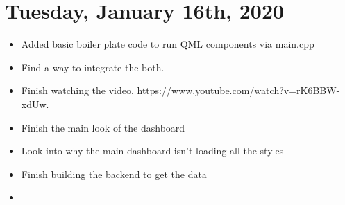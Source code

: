 \documentclass{article}
\begin{document}
    \section{Tuesday, January 16th, 2020}

        \begin{itemize}
            \item Added basic boiler plate code to run QML components via main.cpp
            \item Find a way to integrate the both.
            \item Finish watching the video, https://www.youtube.com/watch?v=rK6BBW-xdUw.
            \item Finish the main look of the dashboard
            \item Look into why the main dashboard isn't loading all the styles
            \item Finish building the backend to get the data
            \item
        \end{itemize}
\end{document}
